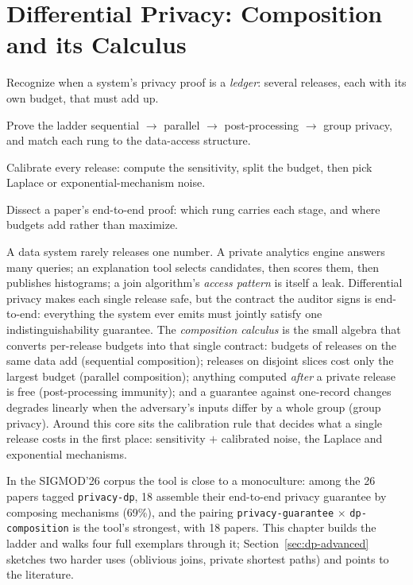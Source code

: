 \chapter{Differential Privacy: Composition and its Calculus}
\setcounter{section}{-1}   %
\label{ch:dp}

\begin{objectives}
\item Recognize when a system's privacy proof is a \emph{ledger}: several releases, each with
  its own budget, that must add up.
\item Prove the ladder sequential $\to$ parallel $\to$ post-processing $\to$ group privacy,
  and match each rung to the data-access structure.
\item Calibrate every release: compute the sensitivity, split the budget, then pick
  Laplace or exponential-mechanism noise.
\item Dissect a paper's end-to-end proof: which rung carries each stage, and where budgets
  add rather than maximize.
\end{objectives}

A data system rarely releases one number. A private analytics engine answers many
queries; an explanation tool selects candidates, then scores them, then publishes
histograms; a join algorithm's \emph{access pattern} is itself a leak. Differential
privacy makes each single release safe, but the contract the auditor signs is
end-to-end: everything the system ever emits must jointly satisfy one
indistinguishability guarantee. The \emph{composition calculus} is the small algebra
that converts per-release budgets into that single contract: budgets of releases on
the same data add (sequential composition); releases on disjoint slices cost only the
largest budget (parallel composition); anything computed \emph{after} a private
release is free (post-processing immunity); and a guarantee against one-record changes
degrades linearly when the adversary's inputs differ by a whole group (group privacy).
Around this core sits the calibration rule that decides what a single release costs
in the first place: sensitivity $+$ calibrated noise, the Laplace and exponential
mechanisms.

In the SIGMOD'26 corpus the tool is close to a monoculture: among the 26 papers tagged
\texttt{privacy-dp}, 18 assemble their end-to-end privacy guarantee by composing
mechanisms (69\%), and the pairing \texttt{privacy-guarantee} $\times$
\texttt{dp-composition} is the tool's strongest, with 18 papers. This chapter builds
the ladder and walks four full exemplars through it;
Section~\ref{sec:dp-advanced} sketches two harder uses (oblivious joins, private
shortest paths) and points to the literature.

